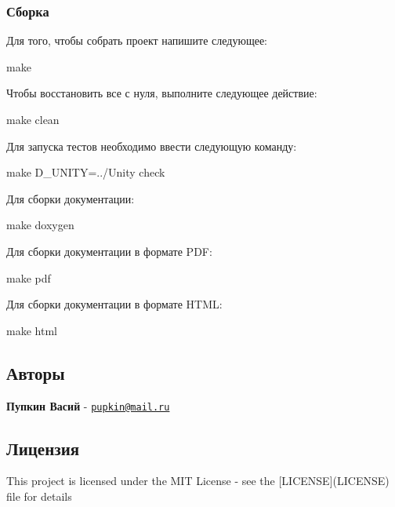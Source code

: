 \subsubsection*{Сборка}

Для того, чтобы собрать проект напишите следующее\+: 
\begin{DoxyCode}
make
\end{DoxyCode}
 Чтобы восстановить все с нуля, выполните следующее действие\+: 
\begin{DoxyCode}
make clean
\end{DoxyCode}
 Для запуска тестов необходимо ввести следующую команду\+: 
\begin{DoxyCode}
make D\_UNITY=../Unity check
\end{DoxyCode}
 Для сборки документации\+: 
\begin{DoxyCode}
make doxygen
\end{DoxyCode}
 Для сборки документации в формате P\+DF\+: 
\begin{DoxyCode}
make pdf
\end{DoxyCode}
 Для сборки документации в формате H\+T\+ML\+: 
\begin{DoxyCode}
make html
\end{DoxyCode}


\subsection*{Авторы}


\begin{DoxyItemize}
\item {\bfseries Пупкин Васий} -\/ \href{mailto:pupkin@mail.ru}{\tt pupkin@mail.\+ru}
\end{DoxyItemize}

\subsection*{Лицензия}

This project is licensed under the M\+IT License -\/ see the \mbox{[}L\+I\+C\+E\+N\+SE\mbox{]}(L\+I\+C\+E\+N\+SE) file for details 